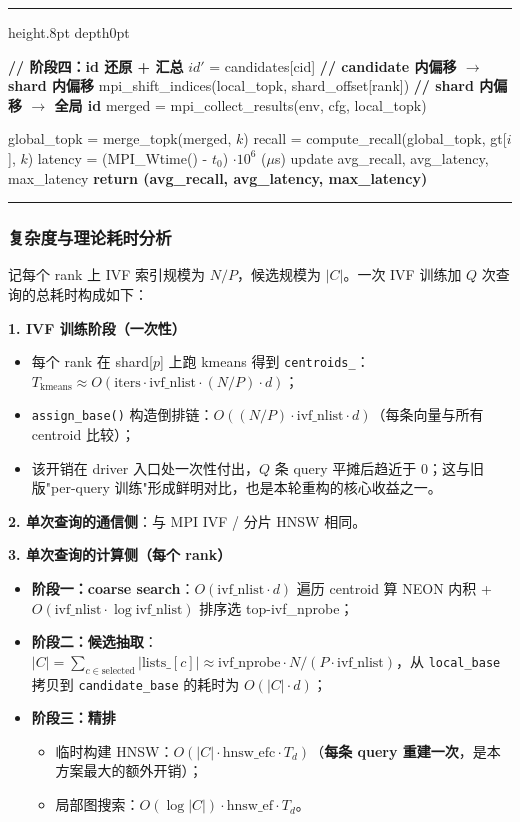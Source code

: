 \documentclass[a4paper]{article}
\makeatletter
\newenvironment{breakablealgorithm}
  {%
  \begin{center}
     \refstepcounter{algorithm}%
     \hrule height.8pt depth0pt \kern2pt%
     \renewcommand{\caption}[2][\relax]{%
      {\raggedright\textbf{\ALG@name~\thealgorithm} ##2\par}%
      \ifx\relax##1\relax %
         \addcontentsline{loa}{algorithm}{\protect\numberline{\thealgorithm}##2}%
      \else %
         \addcontentsline{loa}{algorithm}{\protect\numberline{\thealgorithm}##1}%
      \fi
      \kern2pt\hrule\kern2pt
     }
  }{%
     \kern2pt\hrule\relax%
  \end{center}
  }
\makeatother
\begin{document}
\begin{breakablealgorithm}
\begin{algorithmic}[1]
    \State \textbf{// 阶段四：id 还原 + 汇总}
        \State $id'$ = candidates[cid] \quad \textbf{// candidate 内偏移 $\rightarrow$ shard 内偏移}
    \EndFor
    \State mpi\_shift\_indices(local\_topk, shard\_offset[rank]) \quad \textbf{// shard 内偏移 $\rightarrow$ 全局 id}
    \State merged = mpi\_collect\_results(env, cfg, local\_topk)

        \State global\_topk = merge\_topk(merged, $k$)
        \State recall = compute\_recall(global\_topk, gt[$i$], $k$)
        \State latency = (MPI\_Wtime() - $t_0$) $\cdot 10^6$ ($\mu$s)
        \State update avg\_recall, avg\_latency, max\_latency
    \EndIf
\EndFor
\State \textbf{return (avg\_recall, avg\_latency, max\_latency)}
\end{algorithmic}
\end{breakablealgorithm}

\subsubsection{复杂度与理论耗时分析}

记每个 rank 上 IVF 索引规模为 $N/P$，候选规模为 $|C|$。一次 IVF 训练加 $Q$ 次查询的总耗时构成如下：

\textbf{1. IVF 训练阶段（一次性）}
\begin{itemize}
    \item 每个 rank 在 shard[$p$] 上跑 kmeans 得到 \texttt{centroids\_}：$T_{\text{kmeans}} \approx O(\text{iters} \cdot \text{ivf\_nlist} \cdot (N/P) \cdot d)$；
    \item \texttt{assign\_base()} 构造倒排链：$O((N/P) \cdot \text{ivf\_nlist} \cdot d)$（每条向量与所有 centroid 比较）；
    \item 该开销在 driver 入口处一次性付出，$Q$ 条 query 平摊后趋近于 0；这与旧版"per-query 训练"形成鲜明对比，也是本轮重构的核心收益之一。
\end{itemize}

\textbf{2. 单次查询的通信侧}：与 MPI IVF / 分片 HNSW 相同。

\textbf{3. 单次查询的计算侧（每个 rank）}
\begin{itemize}
    \item \textbf{阶段一：coarse search}：$O(\text{ivf\_nlist} \cdot d)$ 遍历 centroid 算 NEON 内积 + $O(\text{ivf\_nlist} \cdot \log \text{ivf\_nlist})$ 排序选 top-ivf\_nprobe；
    \item \textbf{阶段二：候选抽取}：$|C| = \sum_{c \in \text{selected}} |\text{lists\_}[c]| \approx \text{ivf\_nprobe} \cdot N/(P \cdot \text{ivf\_nlist})$，从 \texttt{local\_base} 拷贝到 \texttt{candidate\_base} 的耗时为 $O(|C| \cdot d)$；
    \item \textbf{阶段三：精排}
    \begin{itemize}
        \item 临时构建 HNSW：$O(|C| \cdot \text{hnsw\_efc} \cdot T_d)$（\textbf{每条 query 重建一次}，是本方案最大的额外开销）；
        \item 局部图搜索：$O(\log |C|) \cdot \text{hnsw\_ef} \cdot T_d$。
    \end{itemize}
\end{itemize}
\end{document}

